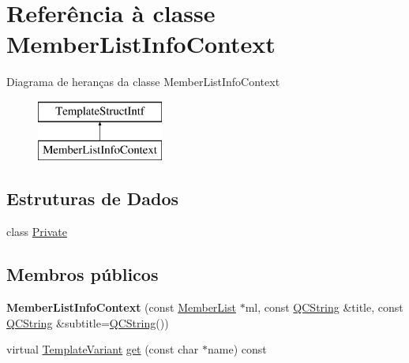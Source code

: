 \hypertarget{class_member_list_info_context}{\section{Referência à classe Member\-List\-Info\-Context}
\label{class_member_list_info_context}
}
Diagrama de heranças da classe Member\-List\-Info\-Context\begin{figure}[H]
\begin{center}
\leavevmode
\includegraphics[height=2.000000cm]{class_member_list_info_context}
\end{center}
\end{figure}
\subsection*{Estruturas de Dados}
\begin{DoxyCompactItemize}
\item 
class \hyperlink{class_member_list_info_context_1_1_private}{Private}
\end{DoxyCompactItemize}
\subsection*{Membros públicos}
\begin{DoxyCompactItemize}
\item 
\hypertarget{class_member_list_info_context_adf9af26c327a5e09b4f7ee51c350e36c}{{\bfseries Member\-List\-Info\-Context} (const \hyperlink{class_member_list}{Member\-List} $\ast$ml, const \hyperlink{class_q_c_string}{Q\-C\-String} \&title, const \hyperlink{class_q_c_string}{Q\-C\-String} \&subtitle=\hyperlink{class_q_c_string}{Q\-C\-String}())}\label{class_member_list_info_context_adf9af26c327a5e09b4f7ee51c350e36c}

\item 
virtual \hyperlink{class_template_variant}{Template\-Variant} \hyperlink{class_member_list_info_context_a1bcfea01201f3ea09981a8442842c42d}{get} (const char $\ast$name) const 
\end{DoxyCompactItemize}


